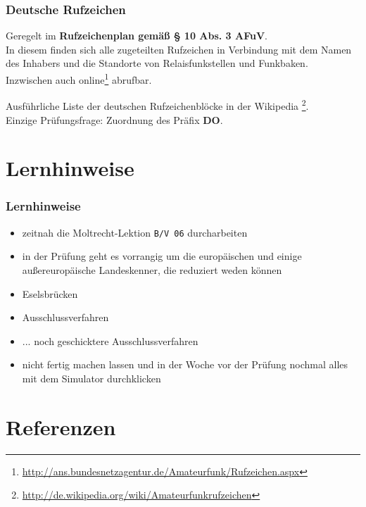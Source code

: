 \begin{frame}
    \frametitle{Deutsche Rufzeichen}

    Geregelt im \textbf{Rufzeichenplan gemäß § 10 Abs. 3 AFuV}. \\[1em]

    In diesem finden sich alle zugeteilten Rufzeichen in Verbindung mit dem
    Namen des Inhabers und die Standorte von Relaisfunkstellen und Funkbaken.
    \\[1em]

    Inzwischen auch online\footnote{\scriptsize\url{http://ans.bundesnetzagentur.de/Amateurfunk/Rufzeichen.aspx}}
    abrufbar.


    Ausführliche Liste der deutschen Rufzeichenblöcke in der Wikipedia
    \footnote{\url{http://de.wikipedia.org/wiki/Amateurfunkrufzeichen}}. \\[1em]

    Einzige Prüfungsfrage: Zuordnung des Präfix \textbf{DO}.

\end{frame}

\section{Lernhinweise}

\begin{frame}
    \frametitle{Lernhinweise}

    \begin{itemize}
        \item zeitnah die Moltrecht-Lektion \texttt{B/V 06} durcharbeiten
        \item in der Prüfung geht es vorrangig um die europäischen und einige
              außereuropäische Landeskenner, die reduziert weden können
        \item Eselsbrücken
        \item Ausschlussverfahren
        \item ... noch geschicktere Ausschlussverfahren
        \item nicht fertig machen lassen und in der Woche vor der Prüfung
              nochmal alles mit dem Simulator durchklicken
    \end{itemize}

\end{frame}

\section{Referenzen}

